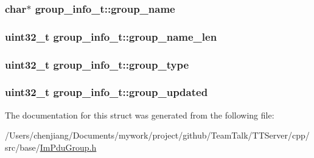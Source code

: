\subsubsection[{group\+\_\+name}]{\setlength{\rightskip}{0pt plus 5cm}char$\ast$ group\+\_\+info\+\_\+t\+::group\+\_\+name}\label{structgroup__info__t_ae4121e42787880b40f8dec0b1b4ebe63}
\hypertarget{structgroup__info__t_a6e553888edf7da80eb61253721d64556}{}
\subsubsection[{group\+\_\+name\+\_\+len}]{\setlength{\rightskip}{0pt plus 5cm}uint32\+\_\+t group\+\_\+info\+\_\+t\+::group\+\_\+name\+\_\+len}\label{structgroup__info__t_a6e553888edf7da80eb61253721d64556}
\hypertarget{structgroup__info__t_af56bf20cb2c1507d4446eca59dee32f2}{}
\subsubsection[{group\+\_\+type}]{\setlength{\rightskip}{0pt plus 5cm}uint32\+\_\+t group\+\_\+info\+\_\+t\+::group\+\_\+type}\label{structgroup__info__t_af56bf20cb2c1507d4446eca59dee32f2}
\hypertarget{structgroup__info__t_a2338bea66c1063bc1b61e4348b03af78}{}
\subsubsection[{group\+\_\+updated}]{\setlength{\rightskip}{0pt plus 5cm}uint32\+\_\+t group\+\_\+info\+\_\+t\+::group\+\_\+updated}\label{structgroup__info__t_a2338bea66c1063bc1b61e4348b03af78}


The documentation for this struct was generated from the following file\+:\begin{DoxyCompactItemize}
\item 
/\+Users/chenjiang/\+Documents/mywork/project/github/\+Team\+Talk/\+T\+T\+Server/cpp/src/base/\hyperlink{_im_pdu_group_8h}{Im\+Pdu\+Group.\+h}\end{DoxyCompactItemize}
